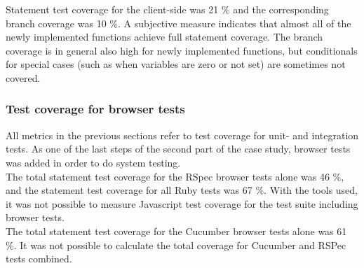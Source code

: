 Statement test coverage for the client-side was 21 \% and the
corresponding branch coverage was 10 \%. A subjective measure
indicates that almost all of the newly implemented functions achieve
full statement coverage. The branch coverage is in general also high for
newly implemented functions, but conditionals for special cases (such as
when variables are zero or not set) are sometimes not covered.\\

\subsubsection{Test coverage for browser tests}

All metrics in the previous sections refer to test coverage for unit-
and integration tests. As one of the last steps of the second part of
the case study, browser tests was added in order to do system
testing.\\

The total statement test coverage for the RSpec browser tests alone was
46 \%, and the statement test coverage for all Ruby tests was 67 \%.
With the tools used, it was not possible to measure Javascript test
coverage for the test suite including browser tests.\\

The total statement test coverage for the Cucumber browser tests alone
was 61 \%. It was not possible to calculate the total coverage for
Cucumber and RSPec tests combined.\\
